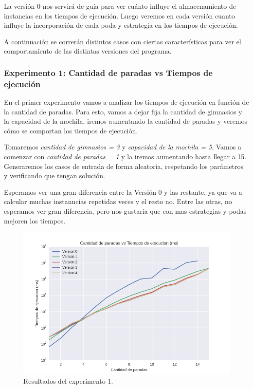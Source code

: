\par La versión 0 nos servirá de guía para ver cuánto influye el almacenamiento de instancias en los tiempos de ejecución. Luego veremos en cada versión cuanto influye la incorporación de cada poda y estrategia en los tiempos de ejecución.

\par A continuación se correrán distintos casos con ciertas características para ver el comportamiento de las distintas versiones del programa.

\subsubsection{Experimento 1: Cantidad de paradas vs Tiempos de ejecución}

\par En el primer experimento vamos a analizar los tiempos de ejecución en función de la cantidad de paradas. Para esto, vamos a dejar fija la cantidad de gimnasios y la capacidad de la mochila, iremos aumentando la cantidad de paradas y veremos cómo se comportan los tiempos de ejecución.

\par Tomaremos \textit{cantidad de gimnasios = 3} y \textit{capacidad de la mochila = 5}. Vamos a comenzar con \textit{cantidad de paradas = 1} y la iremos aumentando hasta llegar a 15. Generaremos los casos de entrada de forma aleatoria, respetando los parámetros y verificando que tengan solución.

\par Esperamos ver una gran diferencia entre la Versión 0 y las restante, ya que va a calcular muchas instanncias repetidas veces y el resto no. Entre las otras, no esperamos ver gran diferencia, pero nos gustaría que con mas estrategias y podas mejoren los tiempos.

\begin{figure}[H]
	\begin{center}
		\includegraphics[width=\textwidth]{img/ejercicio1/exp1_1.png}
		\caption{Resultados del experimento 1.}
		\label{fig: ej1_exp1_1}
	\end{center}
\end{figure}

